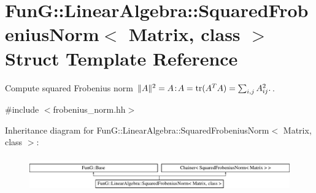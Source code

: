 \hypertarget{structFunG_1_1LinearAlgebra_1_1SquaredFrobeniusNorm}{}\section{Fun\+G\+:\+:Linear\+Algebra\+:\+:Squared\+Frobenius\+Norm$<$ Matrix, class $>$ Struct Template Reference}
\label{structFunG_1_1LinearAlgebra_1_1SquaredFrobeniusNorm}


Compute squared Frobenius norm $ \|A\|^2 = A\negthinspace : \negthinspace A = \mathrm{tr}(A^TA) = \sum_{i,j} A_{ij}^2. $.  




{\ttfamily \#include $<$frobenius\+\_\+norm.\+hh$>$}

Inheritance diagram for Fun\+G\+:\+:Linear\+Algebra\+:\+:Squared\+Frobenius\+Norm$<$ Matrix, class $>$\+:\begin{figure}[H]
\begin{center}
\leavevmode
\includegraphics[height=1.493333cm]{structFunG_1_1LinearAlgebra_1_1SquaredFrobeniusNorm}
\end{center}
\end{figure}
